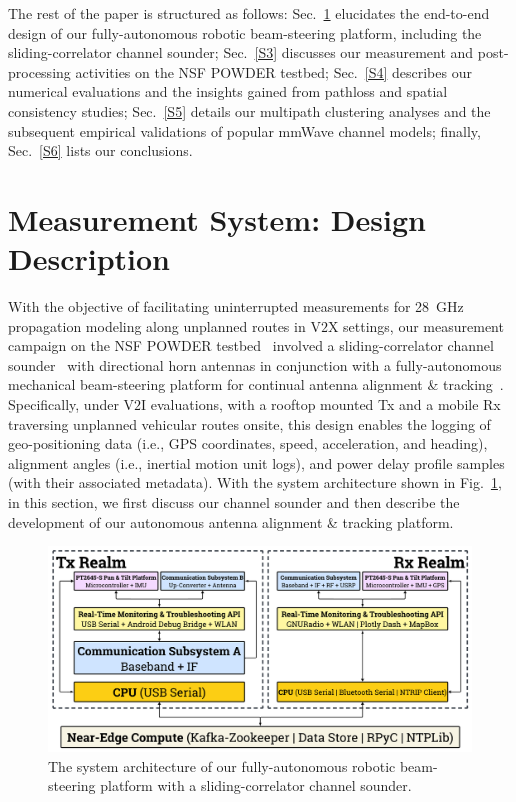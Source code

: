 \documentclass[10pt, twocolumn]{IEEEtran}
\begin{document}
The rest of the paper is structured as follows: Sec.~\ref{S2} elucidates the end-to-end design of our fully-autonomous robotic beam-steering platform, including the sliding-correlator channel sounder; Sec.~\ref{S3} discusses our measurement and post-processing activities on the NSF POWDER testbed; Sec.~\ref{S4} describes our numerical evaluations and the insights gained from pathloss and spatial consistency studies; Sec.~\ref{S5} details our multipath clustering analyses and the subsequent empirical validations of popular mmWave channel models; finally, Sec.~\ref{S6} lists our conclusions.
\vspace{-10mm}

\section{Measurement System: Design Description}\label{S2}
With the objective of facilitating uninterrupted measurements for \SI{28}{\giga\hertz} propagation modeling along unplanned routes in V$2$X settings, our measurement campaign on the NSF POWDER testbed~\cite{POWDER} involved a sliding-correlator channel sounder~\cite{Purdue} with directional horn antennas in conjunction with a fully-autonomous mechanical beam-steering platform for continual antenna alignment \& tracking~\cite{SPAVE_NRSM}. Specifically, under V$2$I evaluations, with a rooftop mounted Tx and a mobile Rx traversing unplanned vehicular routes onsite, this design enables the logging of geo-positioning data (i.e., GPS coordinates, speed, acceleration, and heading), alignment angles (i.e., inertial motion unit logs), and power delay profile samples (with their associated metadata). With the system architecture shown in Fig.~\ref{F1}, in this section, we first discuss our channel sounder and then describe the development of our autonomous antenna alignment \& tracking platform.
\begin{figure} [t]
    \centering
    \includegraphics[width=1.0\textwidth]{figs/system_architecture.pdf}
    \vspace{-8mm}
    \caption{The system architecture of our fully-autonomous robotic beam-steering platform with a sliding-correlator channel sounder.}
    \label{F1}
\end{figure}
\end{document}
